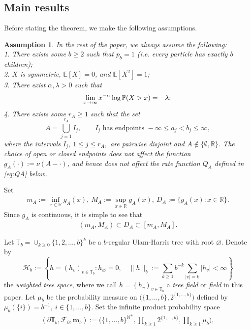\documentclass[a4paper, 11pt]{article}
\newcounter{assum}
\newcommand{\1}{\mathbf 1}
\theoremstyle{plain}
\newtheorem{assumption}{Assumption}[section]
\begin{document}
\subsection{Main results}
Before stating the theorem, we make the following assumptions.
\begin{assumption}\label{45twzg5yy43}
In the rest of the paper, we always assume the following:\\
1. There exists some \(b\geq2\) such that $p_b=1$ (i.e. every particle has exactly $b$ children);\\
2. \(X\) is symmetric, \(\mathbb{E}[X]=0\), and \(\mathbb{E}[X^2]=1\);\\
3. There exist \(\alpha,\lambda>0\) such that
  \begin{equation}\label{eq:tail}
    \lim_{x\to\infty}x^{-\alpha}\log\mathbb{P}(X>x)=-\lambda;\\
  \end{equation}
 4. There exists some \(r_A\geq1\) such that the set
  \[
    A=\bigcup_{j=1}^{r_A}I_j,
    \qquad I_j\text{ has endpoints }-\infty\leq a_j<b_j\leq\infty,
  \]
  where the intervals \(I_j,~1\leq j\leq r_A,\) are pairwise disjoint and \(A\notin\{\emptyset,\mathbb{R}\}\). The choice of open or closed endpoints does not affect the function $g_A(\cdot):=\nu(A-\cdot)$, and hence does not affect the rate function $Q_A$ defined in \eqref{eq:QA} below.
\end{assumption}
\par
Set
\[
\begin{aligned}
  m_A:=\inf_{x\in\mathbb{R}}g_A(x),~M_A:=\sup_{x\in\mathbb{R}}g_A(x),~D_A:=\{g_A(x):x\in\mathbb{R}\}.
\end{aligned}
\]
Since $g_A$ is continuous, it is simple to see that
\begin{align}\label{4gr5yhy6yr4}
(m_A,M_A)\subset D_A\subset[m_A,M_A].
\end{align}
 \par
Let $\mathbb{T}_b=\cup_{k\geq0}\{1,2,...,b\}^k$ be a $b$-regular Ulam-Harris tree with root \(\varnothing\). Denote by
\[
  \mathcal{H}_b
  :=
  \left\{
    h=(h_v)_{v\in\mathbb{T}_b}:h_\varnothing=0,\quad
    \|h\|_b:=
    \sum_{k\geq1}b^{-k}\sum_{|v|=k}|h_v|<\infty
  \right\}
\]
the {\em weighted tree space}, where we call $h=(h_v)_{v\in\mathbb{T}_b}$ a {\em tree field } or {\em field } in this paper. Let \(\mu_b\) be the probability measure on
\(\bigl(\{1,\ldots,b\},2^{\{1,\ldots,b\}}\bigr)\) defined by
$
\mu_b(\{i\})=b^{-1},~i\in\{1,\ldots,b\}.
$
Set the infinite product probability space
\begin{align}\label{54gt24g5gt}
(\partial\mathbb T_b,\mathcal F_{\partial},\mathbf m_b)
:=
\Big(
\{1,\ldots,b\}^{\mathbb N^+},
\prod_{k\geq1}2^{\{1,\ldots,b\}},
\prod_{k\geq1}\mu_b
\Big),
\end{align}
\end{document}
